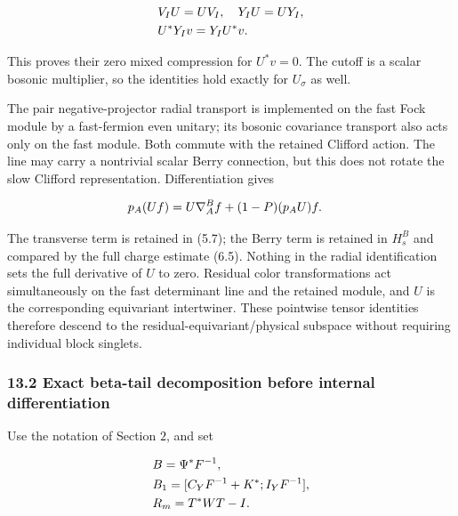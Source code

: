 \begin{gather*}
\begin{aligned}
& V_{I} U=U V_{I}, \quad  Y_{I} U=U Y_{I}, \\
& U^{*}Y_{I} v=Y_{I} U^{*}v.
\end{aligned}\notag
\end{gather*}

This proves their zero mixed compression for \(U^{*}v=0\). The cutoff is
a scalar bosonic multiplier, so the identities hold exactly for
\(U_{\sigma}\) as well.

The pair negative-projector radial transport is implemented on the fast
Fock module by a fast-fermion even unitary; its bosonic covariance
transport also acts only on the fast module. Both commute with the
retained Clifford action. The line may carry a nontrivial scalar Berry
connection, but this does not rotate the slow Clifford representation.
Differentiation gives

\begin{gather*}
\begin{aligned}
& p_{A}(Uf)=U \nabla _{A}^{B} f+(1-P)(p_{A} U)f.
\end{aligned}\notag
\end{gather*}

The transverse term is retained in (5.7); the Berry term is retained in
\(H_{s}^{B}\) and compared by the full charge estimate (6.5). Nothing in
the radial identification sets the full derivative of \(U\) to zero.
Residual color transformations act simultaneously on the fast
determinant line and the retained module, and \(U\) is the corresponding
equivariant intertwiner. These pointwise tensor identities therefore
descend to the residual-equivariant/physical subspace without requiring
individual block singlets.

\subsubsection{13.2 Exact beta-tail decomposition before internal
differentiation}\label{i-exact-beta-tail-decomposition-before-internal-differentiation}

Use the notation of Section \(2\), and set

\begin{gather*}
\begin{aligned}
& B=\Psi ^{*}F^{-1}, \\
& B_{1}=[C_{Y} F^{-1}+K^{*} ; I_{Y} F^{-1}], \\
& R_{m}=T^{*}WT-I.
\end{aligned}\notag
\end{gather*}

